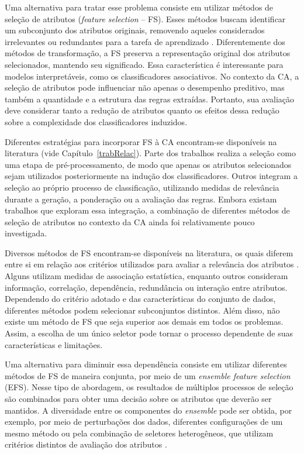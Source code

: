 Uma alternativa para tratar esse problema consiste em utilizar métodos de seleção de atributos (\textit{feature selection} -- FS). Esses métodos buscam identificar um subconjunto dos atributos originais, removendo aqueles considerados irrelevantes ou redundantes para a tarefa de aprendizado \cite{Dhal2022,Theng2024}. Diferentemente dos métodos de transformação, a FS preserva a representação original dos atributos selecionados, mantendo seu significado. Essa característica é interessante para modelos interpretáveis, como os classificadores associativos. No contexto da CA, a seleção de atributos pode influenciar não apenas o desempenho preditivo, mas também a quantidade e a estrutura das regras extraídas. Portanto, sua avaliação deve considerar tanto a redução de atributos quanto os efeitos dessa redução sobre a complexidade dos classificadores induzidos.

Diferentes estratégias para incorporar FS à CA encontram-se disponíveis na literatura (vide Capítulo~\ref{trabRelac}). Parte dos trabalhos realiza a seleção como uma etapa de pré-processamento, de modo que apenas os atributos selecionados sejam utilizados posteriormente na indução dos classificadores. Outros integram a seleção ao próprio processo de classificação, utilizando medidas de relevância durante a geração, a ponderação ou a avaliação das regras. Embora existam trabalhos que exploram essa integração, a combinação de diferentes métodos de seleção de atributos no contexto da CA ainda foi relativamente pouco investigada.

Diversos métodos de FS encontram-se disponíveis na literatura, os quais diferem entre si em relação aos critérios utilizados para avaliar a relevância dos atributos \cite{KHAIRE20221060,Theng2024}. Alguns utilizam medidas de associação estatística, enquanto outros consideram informação, correlação, dependência, redundância ou interação entre atributos. Dependendo do critério adotado e das características do conjunto de dados, diferentes métodos podem selecionar subconjuntos distintos. Além disso, não existe um método de FS que seja superior aos demais em todos os problemas. Assim, a escolha de um único seletor pode tornar o processo dependente de suas características e limitações.

Uma alternativa para diminuir essa dependência consiste em utilizar diferentes métodos de FS de maneira conjunta, por meio de um \textit{ensemble feature selection} (EFS). Nesse tipo de abordagem, os resultados de múltiplos processos de seleção são combinados para obter uma decisão sobre os atributos que deverão ser mantidos. A diversidade entre os componentes do \textit{ensemble} pode ser obtida, por exemplo, por meio de perturbações dos dados, diferentes configurações de um mesmo método ou pela combinação de seletores heterogêneos, que utilizam critérios distintos de avaliação dos atributos \cite{bolon2018scalability,mera2021framework}.

